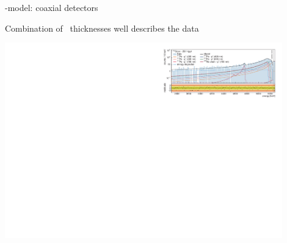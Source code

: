 \documentclass[10pt,aspectratio=169]{beamer}
\begin{document}
\begin{frame}{\a-model: coaxial detectors}
  \begin{simpleblock}
    \centering
    Combination of \pplus\ thicknesses well describes the data
  \end{simpleblock}
  \begin{center}
    \includegraphics[width=0.9\textwidth]{plots/bkg/raw/ph2/results/amodel/amodel-enrCoax.pdf}
  \end{center}
\end{frame}
\end{document}
